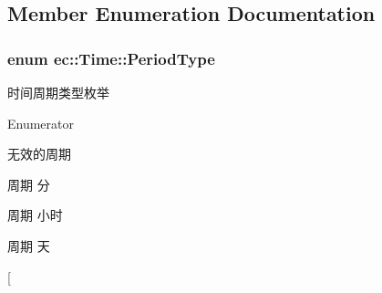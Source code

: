 \subsection{Member Enumeration Documentation}
\hypertarget{classec_1_1Time_a5a62816a9c7f2df3ca66f54d1544ea46}{
\subsubsection[{Period\-Type}]{\setlength{\rightskip}{0pt plus 5cm}enum {\bf ec\-::\-Time\-::\-Period\-Type}}}\label{classec_1_1Time_a5a62816a9c7f2df3ca66f54d1544ea46}
时间周期类型枚举 \begin{Desc}
\item[Enumerator]\par
\begin{description}
\item[{\em 
\hypertarget{classec_1_1Time_a5a62816a9c7f2df3ca66f54d1544ea46a3077b99141eef7503633f22c0424bc8d}{k\-Period\-Minute}\label{classec_1_1Time_a5a62816a9c7f2df3ca66f54d1544ea46a3077b99141eef7503633f22c0424bc8d}
}]无效的周期 \item[{\em 
\hypertarget{classec_1_1Time_a5a62816a9c7f2df3ca66f54d1544ea46a9f3a401b1323abb49064aeff0e106b12}{k\-Period\-Hour}\label{classec_1_1Time_a5a62816a9c7f2df3ca66f54d1544ea46a9f3a401b1323abb49064aeff0e106b12}
}]周期 分 \item[{\em 
\hypertarget{classec_1_1Time_a5a62816a9c7f2df3ca66f54d1544ea46a9a5100abd3e34402f2ee8bb574ce6372}{k\-Period\-Day}\label{classec_1_1Time_a5a62816a9c7f2df3ca66f54d1544ea46a9a5100abd3e34402f2ee8bb574ce6372}
}]周期 小时 \item[{\em 
\hypertarget{classec_1_1Time_a5a62816a9c7f2df3ca66f54d1544ea46a54ad8e4b3e752368ee49fb1914d92822}{k\-Period\-Week}\label{classec_1_1Time_a5a62816a9c7f2df3ca66f54d1544ea46a54ad8e4b3e752368ee49fb1914d92822}
}]周期 天 \item[{\em 
}
\end{description}
\end{Desc}
